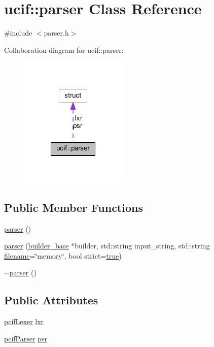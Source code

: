 \hypertarget{classucif_1_1parser}{\section{ucif\-:\-:parser Class Reference}
\label{classucif_1_1parser}
}


{\ttfamily \#include $<$parser.\-h$>$}



Collaboration diagram for ucif\-:\-:parser\-:
\nopagebreak
\begin{figure}[H]
\begin{center}
\leavevmode
\includegraphics[width=144pt]{classucif_1_1parser__coll__graph}
\end{center}
\end{figure}
\subsection*{Public Member Functions}
\begin{DoxyCompactItemize}
\item 
\hyperlink{classucif_1_1parser_aee0ff2711f585b123f7984deacc1c989}{parser} ()
\item 
\hyperlink{classucif_1_1parser_ac292e778a980fb0979d8d47e388fe1a7}{parser} (\hyperlink{structucif_1_1builder__base}{builder\-\_\-base} $\ast$builder, std\-::string input\-\_\-string, std\-::string \hyperlink{write_fields2_file_8m_af3723aa817dbb65282d5e1db81f08ad8}{filename}=\char`\"{}memory\char`\"{}, bool strict=\hyperlink{antlr3convertutf_8h_a41f9c5fb8b08eb5dc3edce4dcb37fee7}{true})
\item 
\hyperlink{classucif_1_1parser_a3148f30c74d8626cc13e7fe242533808}{$\sim$parser} ()
\end{DoxyCompactItemize}
\subsection*{Public Attributes}
\begin{DoxyCompactItemize}
\item 
\hyperlink{cif_lexer_8h_a24536aac4e7a694acef52544113d35c1}{pcif\-Lexer} \hyperlink{classucif_1_1parser_af1084406da34f99fc0897f3ad27b80b1}{lxr}
\item 
\hyperlink{cif_parser_8h_a2c4077303fc91acabafb1e288c8fba3b}{pcif\-Parser} \hyperlink{classucif_1_1parser_ac358b9158878717c4209f8f0ebe227cc}{psr}
\end{DoxyCompactItemize}


